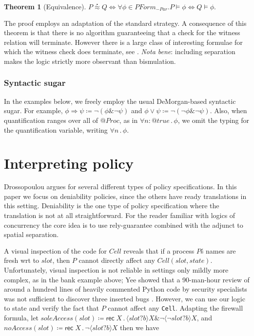 \documentclass[]{acm_proc_article-sp}
\makeatletter
\newcommand{\quotep}[1]{@#1}
\newcommand{\QProc}{\quotep{\mathbin{Proc}}}
\newcommand{\defneqls}{\coloneqq}
\newcommand{\wbbisim}{\stackrel{\centerdot}{\approx}} %
\newcommand{\ptrue}{\mathbin{true}}
\newcommand{\pprefix}[3]{\langle #1 ? #2 \rangle #3}
\newcommand{\pgfp}[2]{\textsf{rec} \; #1 \mathbin{.} #2}
\newcommand{\pquant}[3]{\forall #1 \mathbin{:} #2 \mathbin{.} #3}
\newcommand{\pquantuntyped}[2]{\forall #1 \mathbin{.} #2}
\newcommand{\riff}{\Leftrightarrow}
\newcommand{\PFormula}{\mathbin{PForm}}
\newtheorem{thm}{Theorem}[subsection]
\numberwithin{equation}{subsection}
\makeatother
\begin{document}
\begin{thm}[Equivalence]\label{sec:equivalence_theorem}
	$P \wbbisim Q \riff \forall \phi \in \PFormula_{-Par} . P \models \phi \riff Q \models \phi .$
\end{thm}

The proof employs an adaptation of the standard strategy. A
consequence of this theorem is that there is no algorithm guaranteeing
that a check for the witness relation will terminate. However there is
a large class of interesting formulae for which the witness check does
terminate, see \cite{DBLP:conf/fossacs/Caires04}. {\em Nota bene}: including
separation makes the logic strictly more observant than bismulation.

\subsubsection{Syntactic sugar }

In the examples below, we freely employ the usual DeMorgan-based
syntactic sugar. For example, $\phi \Rightarrow \psi \defneqls \neg (
\phi \& \neg \psi )$ and $\phi \vee \psi \defneqls \neg ( \neg \phi \&
\neg \psi )$. Also, when quantification ranges over all of $\QProc$,
as in $\pquant{n}{\quotep{\ptrue}}{\phi}$, we omit the typing for the
quantification variable, writing $\pquantuntyped{n}{\phi}$.

\section{Interpreting policy}

Drossopoulou \cite{Drossopoulou:2013:NCP:2489804.2489811} argues for
several different types of policy specifications. In this paper we
focus on deniability policies, since the others have ready
translations in this setting. Deniability is the one type of policy
specification where the translation is not at all straightforward. For
the reader familiar with logics of concurrency the core idea is to use
rely-guarantee combined with the adjunct to spatial separation.

A visual inspection of the code for $Cell$ reveals that if a process
$P$\'s names are fresh wrt to $slot$, then $P$ cannot directly affect
any $Cell( slot, state )$. Unfortunately, visual inspection is not
reliable in settings only mildly more complex, as in the bank example
above; Yee showed that a 90-man-hour review of around a hundred lines
of heavily commented Python code by security specialists was not
sufficient to discover three inserted bugs \cite[Section
7]{Yee:EECS-2007-136}.  However, we can use our logic to state and
verify the fact that $P$ cannot affect any {\tt Cell}. Adapting the
firewall formula, let $soleAccess( slot ) \defneqls
\pgfp{X}{\pprefix{slot}{b}{X} \& \neg \pprefix{\neg slot}{b}{X}}$, and
$noAccess( slot ) \defneqls \pgfp{X}{\neg \pprefix{slot}{b}{X}}$ then
we have
\end{document}
